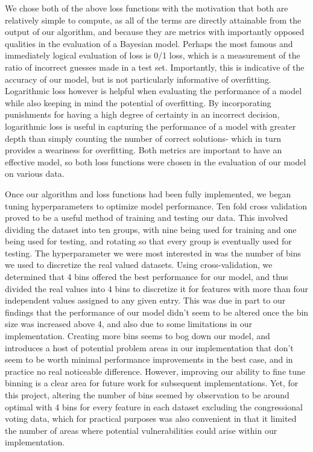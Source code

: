 \documentclass[twoside,11pt]{article}
\begin{document}
We chose both of the above loss functions with the motivation that both are relatively simple to compute, as all of the terms are directly attainable from the output of our algorithm, and
because they are metrics with importantly opposed qualities in the evaluation of a Bayesian model. Perhaps the most famous and immediately logical evaluation of loss is 0/1 loss, 
which is a measurement of the ratio of incorrect guesses made in a test set. Importantly, this is indicative of the accuracy of our model, but is not particularly informative of overfitting.
Logarithmic loss however is helpful when evaluating the performance of a model while also keeping in mind the potential of overfitting. By incorporating punishments for having a high degree
of certainty in an incorrect decision, logarithmic loss is useful in capturing the performance of a model with greater depth than simply counting the number of correct solutions- 
which in turn provides a weariness for overfitting.
Both metrics are important to have an effective model, so both loss functions were chosen in the evaluation of our model on various data.

Once our algorithm and loss functions had been fully implemented, we began tuning hyperparameters to optimize model performance. Ten fold cross validation proved to be a useful method of training and 
testing our data. This involved dividing the dataset into ten groups, with nine being used for training and one being used for testing, and rotating so that every group is eventually used for testing. The 
hyperparameter we were most interested in was the number of bins we used to discretize the real valued datasets. 
Using cross-validation, we determined that 4 bins offered the best performance for our model, and thus divided the real values into 4 bins to discretize it for features
with more than four independent values assigned to any given entry. This was due in part to our findings that the performance
of our model didn't seem to be altered once the bin size was increased above 4, and also due to some limitations in our implementation. Creating more bins seems to bog down
our model, and introduces a host of potential problem areas in our implementation that don't seem to be worth minimal performance improvements in the best case, and 
in practice no real noticeable difference. However, improving our ability to fine tune binning is a clear area for future work for subsequent implementations. Yet, for this
project, altering the number of bins seemed by observation to be around optimal with 4 bins for every feature in each dataset excluding the congressional voting data, 
which for practical purposes was also convenient in that it limited the number of areas where potential vulnerabilities could arise within our implementation.
\end{document}
